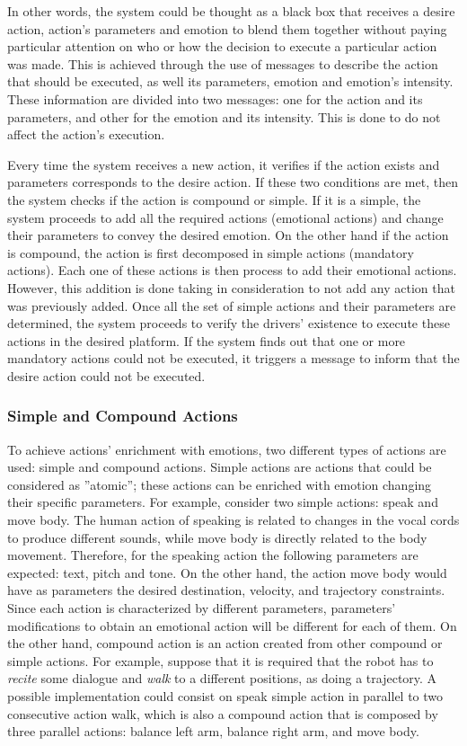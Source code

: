 In other words, the system could be thought as a black box that receives a desire action, action's parameters and emotion to blend them together without paying particular attention on who or how the decision to execute a particular action was made. This is achieved through the use of messages to describe the action that should be executed, as well its parameters, emotion and emotion's intensity.  These information are divided into two messages: one for the action and its parameters, and other for the emotion and its intensity. This is done to do not affect the action's execution.

Every time the system receives a new action, it verifies if the action exists and parameters corresponds to the desire action. If these two conditions are met, then the system checks if the action is compound or simple. If it is a simple, the system proceeds to add all the required actions (emotional actions) and change their parameters to convey the desired emotion. On the other hand if the action is compound, the action is first decomposed in simple actions (mandatory actions). Each one of these actions is then process to add their emotional actions. However, this addition is done taking in consideration to not add any action that was previously added. Once all the set of simple actions and their parameters are determined, the system proceeds to verify the drivers' existence to execute these actions in the desired platform. If the system finds out that one or more mandatory actions could not be executed, it triggers a message to inform that the desire action could not be executed. 

\subsubsection{Simple and Compound Actions}

To achieve actions' enrichment with emotions, two different types of actions are used: simple and compound actions. Simple actions are actions that could be considered as ''atomic''; these actions can be enriched with emotion changing their specific parameters. For example, consider two simple actions: speak and move body. The human action of speaking is related to changes in the vocal cords to produce different sounds, while move body is directly related to the body movement. Therefore, for the speaking action the following parameters are expected: text, pitch and tone. On the other hand, the action move body would have as parameters the desired destination, velocity, and trajectory constraints. Since each action is characterized by different parameters, parameters' modifications to obtain an emotional action will be different for each of them. On the other hand, compound action is an action created from other compound or simple actions. For example, suppose that it is required that the robot has to \textit{recite} some dialogue and \textit{walk} to a different positions, as doing a trajectory. A possible implementation could consist on speak simple action in parallel to two consecutive action walk, which is also a compound action that is composed by three parallel actions: balance left arm, balance right arm, and move body.

